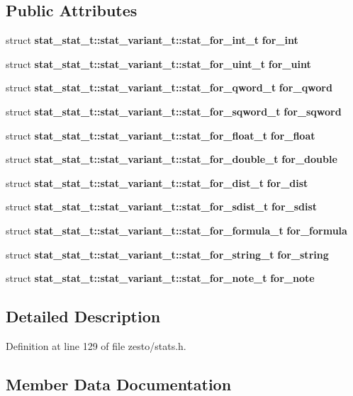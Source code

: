 \subsection*{Public Attributes}
\begin{CompactItemize}
\item 
struct {\bf stat\_\-stat\_\-t::stat\_\-variant\_\-t::stat\_\-for\_\-int\_\-t} {\bf for\_\-int}
\item 
struct {\bf stat\_\-stat\_\-t::stat\_\-variant\_\-t::stat\_\-for\_\-uint\_\-t} {\bf for\_\-uint}
\item 
struct {\bf stat\_\-stat\_\-t::stat\_\-variant\_\-t::stat\_\-for\_\-qword\_\-t} {\bf for\_\-qword}
\item 
struct {\bf stat\_\-stat\_\-t::stat\_\-variant\_\-t::stat\_\-for\_\-sqword\_\-t} {\bf for\_\-sqword}
\item 
struct {\bf stat\_\-stat\_\-t::stat\_\-variant\_\-t::stat\_\-for\_\-float\_\-t} {\bf for\_\-float}
\item 
struct {\bf stat\_\-stat\_\-t::stat\_\-variant\_\-t::stat\_\-for\_\-double\_\-t} {\bf for\_\-double}
\item 
struct {\bf stat\_\-stat\_\-t::stat\_\-variant\_\-t::stat\_\-for\_\-dist\_\-t} {\bf for\_\-dist}
\item 
struct {\bf stat\_\-stat\_\-t::stat\_\-variant\_\-t::stat\_\-for\_\-sdist\_\-t} {\bf for\_\-sdist}
\item 
struct {\bf stat\_\-stat\_\-t::stat\_\-variant\_\-t::stat\_\-for\_\-formula\_\-t} {\bf for\_\-formula}
\item 
struct {\bf stat\_\-stat\_\-t::stat\_\-variant\_\-t::stat\_\-for\_\-string\_\-t} {\bf for\_\-string}
\item 
struct {\bf stat\_\-stat\_\-t::stat\_\-variant\_\-t::stat\_\-for\_\-note\_\-t} {\bf for\_\-note}
\end{CompactItemize}


\subsection{Detailed Description}


Definition at line 129 of file zesto/stats.h.

\subsection{Member Data Documentation}
